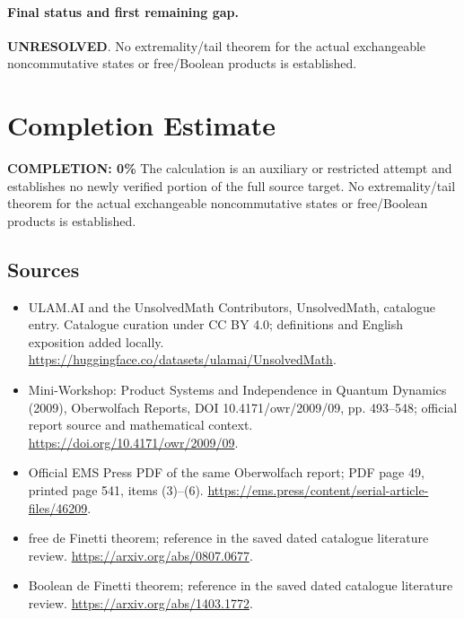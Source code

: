 \documentclass[11pt]{article}
\begin{document}
\paragraph{Final status and first remaining gap.}
\textbf{UNRESOLVED}. No extremality/tail theorem for the actual exchangeable noncommutative states or free/Boolean products is established.

\section{Completion Estimate}
\noindent\textbf{COMPLETION: 0\%}
The calculation is an auxiliary or restricted attempt and establishes no newly verified portion of the full source target. No extremality/tail theorem for the actual exchangeable noncommutative states or free/Boolean products is established.

\subsection{Sources}
\begin{itemize}
\item[\hypertarget{source:statement:1}{S1}] ULAM.AI and the UnsolvedMath Contributors, UnsolvedMath, catalogue entry. Catalogue curation under CC BY 4.0; definitions and English exposition added locally.
\url{https://huggingface.co/datasets/ulamai/UnsolvedMath}.
\item[\hypertarget{source:statement:2}{S2}] Mini-Workshop: Product Systems and Independence in Quantum Dynamics (2009), Oberwolfach Reports, DOI 10.4171/owr/2009/09, pp. 493--548; official report source and mathematical context.
\url{https://doi.org/10.4171/owr/2009/09}.
\item[\hypertarget{source:statement:3}{S3}] Official EMS Press PDF of the same Oberwolfach report; PDF page 49, printed page 541, items (3)--(6).
\url{https://ems.press/content/serial-article-files/46209}.
\item[\hypertarget{source:statement:4}{S4}] free de Finetti theorem; reference in the saved dated catalogue literature review.
\url{https://arxiv.org/abs/0807.0677}.
\item[\hypertarget{source:statement:5}{S5}] Boolean de Finetti theorem; reference in the saved dated catalogue literature review.
\url{https://arxiv.org/abs/1403.1772}.
\end{itemize}
\label{end:statement}
\end{document}
